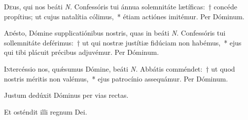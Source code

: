\documentclass[vesperale_romanum.tex]{subfiles}
\begin{document}
\oratio

\lettrine{D}{e}us, qui nos beáti \textit{N.} Confessóris tui ánnua solemnitáte lætíficas:~† concéde propítius; ut cujus natalítia cólimus,~* étiam actiónes imitémur. Per Dóminum.

\aliaoratio

\lettrine{A}{d}ésto, Dómine supplicatiónibus nostris, quas in beáti \textit{N.} Confessóris tui sollemnitáte deférimus:~† ut qui nostræ justítiæ fidúciam non habémus,~* ejus qui tibi plácuit précibus adjuvémur. Per Dóminum.

\lettrine{I}{n}tercéssio nos, quǽsumus Dómine, beáti \textit{N.} Abbátis comméndet:~† ut quod nostris méritis non valémus,~* ejus patrocínio assequámur. Per Dóminum.



\ivesperisrubrique

\vv Justum dedúxit Dóminus per vias rectas.

\rr Et osténdit illi regnum Dei.

\label{an_hic_vir_despiciens_solesmes_1961}
{}

\end{document}
